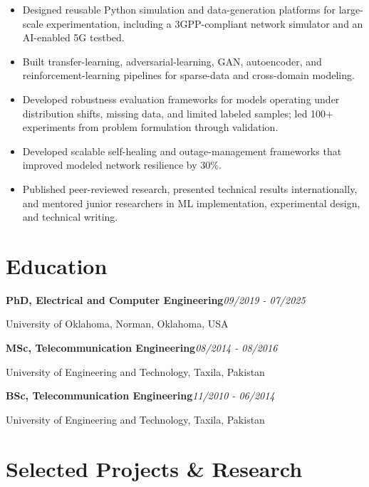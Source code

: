 \documentclass[9pt,letterpaper]{extarticle}
\newcommand{\entry}[2]{\Needspace{4\baselineskip}\textbf{#1}\hfill\textit{#2}\par}
\begin{document}
\begin{itemize}
\item Designed reusable Python simulation and data-generation platforms for large-scale experimentation, including a 3GPP-compliant network simulator and an AI-enabled 5G testbed.
\item Built transfer-learning, adversarial-learning, GAN, autoencoder, and reinforcement-learning pipelines for sparse-data and cross-domain modeling.
\item Developed robustness evaluation frameworks for models operating under distribution shifts, missing data, and limited labeled samples; led 100+ experiments from problem formulation through validation.
\item Developed scalable self-healing and outage-management frameworks that improved modeled network resilience by 30\%.
\item Published peer-reviewed research, presented technical results internationally, and mentored junior researchers in ML implementation, experimental design, and technical writing.
\end{itemize}
\section{Education}
\entry{PhD, Electrical and Computer Engineering}{09/2019 - 07/2025}
University of Oklahoma, Norman, Oklahoma, USA\par
\entry{MSc, Telecommunication Engineering}{08/2014 - 08/2016}
University of Engineering and Technology, Taxila, Pakistan\par
\entry{BSc, Telecommunication Engineering}{11/2010 - 06/2014}
University of Engineering and Technology, Taxila, Pakistan\par
{}
\section{Selected Projects \& Research}
\end{document}
